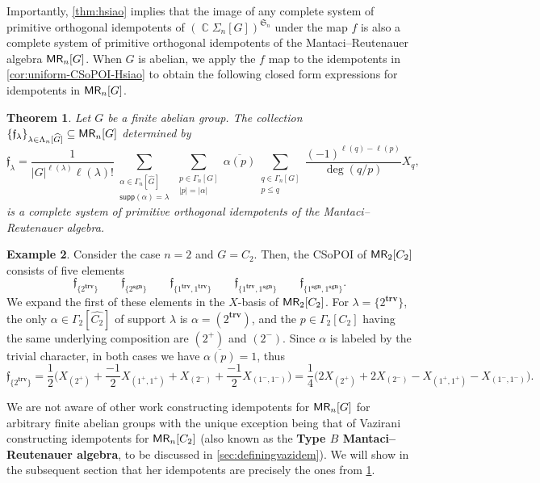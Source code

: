 \documentclass[11pt, oneside, reqno]{amsart}
\newtheorem{theorem}{Theorem}[section]
\theoremstyle{definition}
\newtheorem{example}[theorem]{Example}
\numberwithin{equation}{section}
\DeclareMathOperator{\C}{\mathbb{C}}
\newcommand{\defn}[1]{{\color{RoyalBlue}\bf#1}}
\def \MR {{\sf{MR}}}
\def \kk{\C}
\def \ol{\overline}
\def \sym{\mathfrak{S}}
\def \wh{\widehat}
\def \ztwo {{C_2}}
\def \gsetcomposition{{\Sigma_n[G]}}
\def \hsiao {{\gsetcomposition}}
\def \supp{\mathsf{supp}}
\def \sgn{\mathbf{sgn}}
\def \trv{\mathbf{trv}}
\newcommand{\abs}[1]{|{#1}|} 				%
\begin{document}
Importantly, \cref{thm:hsiao} implies that the image of any complete system of primitive orthogonal idempotents of $(\kk \hsiao)^{\sym_n}$ under the map $f$ is also a complete system of primitive orthogonal idempotents of the Mantaci--Reutenauer algebra $\MR_n[G]$.
When $G$ is abelian, we apply the $f$ map to the idempotents in \cref{cor:uniform-CSoPOI-Hsiao} to obtain the following closed form expressions for idempotents in $\MR_n[G]$.

\begin{theorem}\label{cor:CSoPOIforMR}
    Let $G$ be a finite abelian group.
    The collection $\{ \mathfrak{f}_{\lambda} \}_{\lambda \in \Lambda_n[\wh{G}]} \subseteq \MR_n[G]$ determined by
    \[
        \mathfrak{f}_{\lambda} = \frac{1}{|G|^{\ell(\lambda)} \ell(\lambda)!} \sum_{\substack{ \alpha \in \Gamma_n[\wh{G}] \\ \supp(\alpha) = \lambda}} \sum_{\substack{p \in \Gamma_n[G] \\ \abs{p} = \abs{\alpha} }} \ol{\alpha(p)} \sum_{\substack{q \in \Gamma_n[G] \\ p \leq q }} \dfrac{(-1)^{\ell(q)-\ell(p)}}{\deg(q/p)} X_q,
    \]
    is a complete system of primitive orthogonal idempotents of the Mantaci--Reutenauer algebra.
\end{theorem}

\begin{example}
    Consider the case $n=2$ and $G =\ztwo$. Then, the CSoPOI of $\MR_2[\ztwo]$ consists of five elements
    \[
        \mathfrak{f}_{\{2^{\trv}\}}\qquad\mathfrak{f}_{\{2^{\sgn}\}}\qquad\mathfrak{f}_{\{1^{\trv},1^{\trv}\}}\qquad\mathfrak{f}_{\{1^{\trv},1^{\sgn}\}}\qquad\mathfrak{f}_{\{1^{\sgn},1^{\sgn}\}}.
    \]
    We expand the first of these elements in the $X$-basis of $\MR_2[\ztwo]$.
    For $\lambda = \{2^{\trv}\}$, the only $\alpha \in \Gamma_2[\wh{\ztwo}]$ of support $\lambda$ is $\alpha = (2^{\trv})$, and the $p \in \Gamma_2[\ztwo]$ having the same underlying composition are $(2^+)$ and $(2^-)$. Since $\alpha$ is labeled by the trivial character, in both cases we have $\ol{\alpha(p)} = 1$, thus
    \[
        \mathfrak{f}_{\{2^{\trv}\}} = 
        \dfrac{1}{2} \Big( X_{(2^+)} + \dfrac{-1}{2} X_{(1^+,1^+)} + X_{(2^-)} + \dfrac{-1}{2} X_{(1^-,1^-)} \Big) =
        \dfrac{1}{4} \Big( 2 X_{(2^+)} + 2 X_{(2^-)} - X_{(1^+,1^+)} - X_{(1^-,1^-)} \Big).
    \]
\end{example}

We are not aware of other work constructing idempotents for $\MR_n[G]$ for
arbitrary finite abelian groups with the unique exception being that of Vazirani
\cite{vazirani} constructing idempotents for $\MR_n[C_2]$
(also known as the \defn{Type $B$ Mantaci--Reutenauer algebra}, to be discussed
in \cref{sec:definingvazidem}).
We will show in the subsequent section that her idempotents are precisely the ones from \cref{cor:CSoPOIforMR}.
\end{document}
